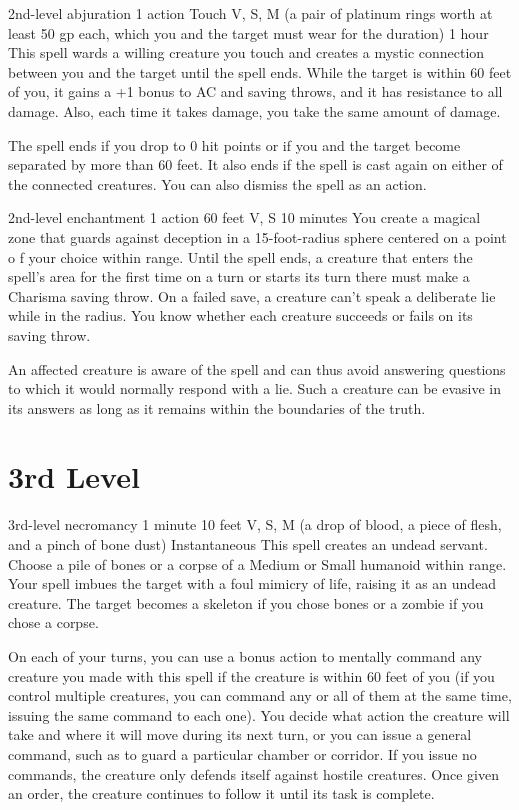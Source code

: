 \documentclass[10pt,twoside,twocolumn,openany]{book}
\begin{document}
{2nd-level abjuration}
{\color{action}1 action}
{Touch}
{V, S, M (a pair of platinum rings worth at least {\color{cost}50 gp} each, which you and the target must wear for the duration)}
{1 hour}
%
This spell wards a willing creature you touch and creates a mystic connection between you and the target until the spell ends. While the target is within 60 feet of you, it gains a +1 bonus to AC and saving throws, and it has resistance to all damage. Also, each time it takes damage, you take the same amount of damage.

The spell ends if you drop to 0 hit points or if you and the target become separated by more than 60 feet. It also ends if the spell is cast again on either of the connected creatures. You can also dismiss the spell as an action.

{2nd-level enchantment}
{\color{action}1 action}
{60 feet}
{V, S}
{10 minutes}
%
You create a magical zone that guards against deception in a 15-foot-radius sphere centered on a point o f your choice within range. Until the spell ends, a creature that enters the spell's area for the first time on a turn or starts its turn there must make a Charisma saving throw. On a failed save, a creature can't speak a deliberate lie while in the radius. You know whether each creature succeeds or fails on its saving throw.

An affected creature is aware of the spell and can thus avoid answering questions to which it would normally respond with a lie. Such a creature can be evasive in its answers as long as it remains within the boundaries of the truth.

\clearpage
\section{3rd Level}

{3rd-level necromancy}
{1 minute}
{10 feet}
{V, S, M (a drop of blood, a piece of flesh, and a pinch of bone dust)}
{Instantaneous}
%
This spell creates an undead servant. Choose a pile of bones or a corpse of a Medium or Small humanoid within range. Your spell imbues the target with a foul mimicry of life, raising it as an undead creature. The target becomes a skeleton if you chose bones or a zombie if you chose a corpse.

On each of your turns, you can use a bonus action to mentally command any creature you made with this spell if the creature is within 60 feet of you (if you control multiple creatures, you can command any or all of them at the same time, issuing the same command to each one). You decide what action the creature will take and where it will move during its next turn, or you can issue a general command, such as to guard a particular chamber or corridor. If you issue no commands, the creature only defends itself against hostile creatures. Once given an order, the creature continues to follow it until its task is complete.
\end{document}
